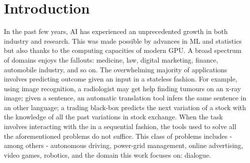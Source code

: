 \chapter{Introduction}
\label{chapter:introduction}

In the past few years, \gls{AI} has experienced an unprecedented growth in both industry and research.
This was made possible by advances in \gls{ML} and statistics but also thanks to the computing capacities of modern \gls{GPU}.
A broad spectrum of domains enjoys the fallouts: medicine, law, digital marketing, finance, automobile industry, and so on.
The overwhelming majority of applications involves predicting outcome given an input in a stateless fashion.
For example, using image recognition, a radiologist may get help finding tumours on an x-ray image; given a sentence, an automatic translation tool infers the same sentence in an other language; a trading black-box predicts the next variation of a stock with the knowledge of all the past variations in stock exchange.
When the task involves interacting with the  in a sequential fashion, the tools used to solve all the aforementioned problems do not suffice. This class of problems includes - among others - autonomous driving, power-grid management, online advertising, video games, robotics, and the domain this work focuses on: dialogue.


